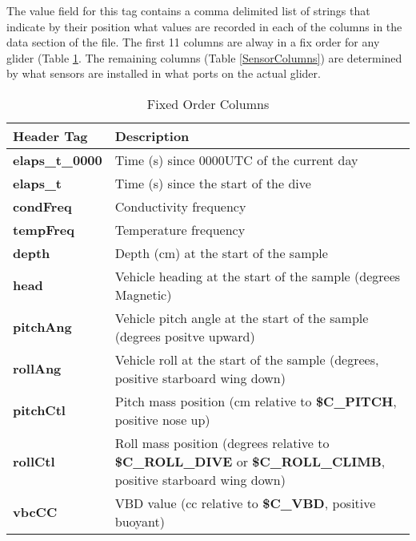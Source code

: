 \documentclass[12pt,english,twoside]{book}
\providecommand{\tabularnewline}{\\}
\begin{document}
The value field for this tag contains a comma delimited list of strings
that indicate by their position what values are recorded in each of
the columns in the data section of the file. The first 11 columns
are alway in a fix order for any glider (Table \ref{FixedOrderColumns}.
The remaining columns (Table \ref{SensorColumns}) are determined
by what sensors are installed in what ports on the actual glider.

%
\begin{table}
\begin{centering}\begin{tabular}{|l|p{4.5in}|}
\hline 
\textbf{Header Tag} &
\textbf{Description} \tabularnewline
\hline 
\textbf{elaps\_t\_0000}&
Time (s) since 0000UTC of the current day\tabularnewline
\hline 
\textbf{elaps\_t} &
Time (s) since the start of the dive \tabularnewline
\hline 
\textbf{condFreq}&
Conductivity frequency\tabularnewline
\hline 
\textbf{tempFreq}&
Temperature frequency\tabularnewline
\hline 
\textbf{depth} &
Depth (cm) at the start of the sample \tabularnewline
\hline 
\textbf{head}&
Vehicle heading at the start of the sample (degrees Magnetic) \tabularnewline
\hline 
\textbf{pitchAng}&
Vehicle pitch angle at the start of the sample (degrees positve upward) \tabularnewline
\hline 
\textbf{rollAng}&
Vehicle roll at the start of the sample (degrees, positive starboard
wing down) \tabularnewline
\hline 
\textbf{pitchCtl}&
Pitch mass position (cm relative to \textbf{\$C\_PITCH}, positive
nose up) \tabularnewline
\hline 
\textbf{rollCtl}&
Roll mass position (degrees relative to \textbf{\$C\_ROLL\_DIVE} or
\textbf{\$C\_ROLL\_CLIMB}, positive starboard wing down) \tabularnewline
\hline 
\textbf{vbcCC}&
VBD value (cc relative to \textbf{\$C\_VBD}, positive buoyant) \tabularnewline
\end{tabular}\par\end{centering}


\caption{Fixed Order Columns}

\label{FixedOrderColumns} 
\end{table}
\end{document}
